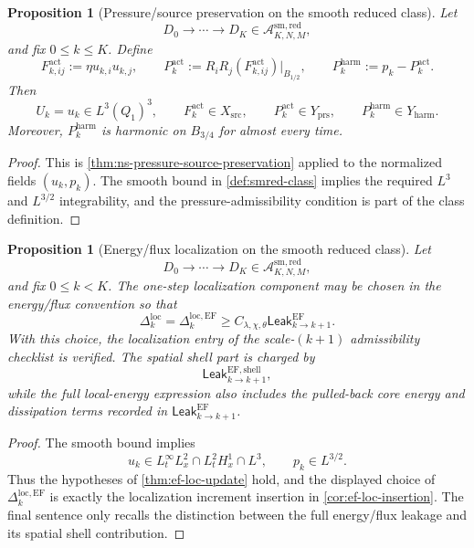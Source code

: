 \documentclass[11pt]{article}
\numberwithin{equation}{section}
\theoremstyle{plain}
\newtheorem{proposition}[theorem]{Proposition}
\theoremstyle{definition}
\theoremstyle{remark}
\newcommand{\prs}{\mathrm{prs}}
\newcommand{\harm}{\mathrm{harm}}
\newcommand{\locerr}{\mathrm{loc}}
\newcommand{\Leak}{\mathsf{Leak}}
\newcommand{\A}{\mathcal A}
\begin{document}
\begin{proposition}[Pressure/source preservation on the smooth reduced class]\label{prop:smred-pressure-source}
Let
\[
  D_0\to\cdots\to D_K\in\A_{K,N,M}^{\mathrm{sm,red}},
\]
and fix \(0\le k\le K\).  Define
\[
  F^{\mathrm{act}}_{k,ij}:=\eta u_{k,i}u_{k,j},
  \qquad
  P_k^{\mathrm{act}}:=R_iR_j(F^{\mathrm{act}}_{k,ij})\big|_{B_{1/2}},
  \qquad
  P_k^{\harm}:=p_k-P_k^{\mathrm{act}}.
\]
Then
\[
  U_k=u_k\in L^3(Q_1)^3,\qquad
  F_k^{\mathrm{act}}\in X_{\mathrm{src}},
  \qquad
  P_k^{\mathrm{act}}\in Y_{\prs},
  \qquad
  P_k^{\harm}\in Y_{\harm}.
\]
Moreover, \(P_k^{\harm}\) is harmonic on \(B_{3/4}\) for almost every time.
\end{proposition}

\begin{proof}
This is \cref{thm:ns-pressure-source-preservation} applied to the normalized
fields \((u_k,p_k)\).  The smooth bound in
\cref{def:smred-class} implies the required \(L^3\) and \(L^{3/2}\)
integrability, and the pressure-admissibility condition is part of the class
definition.
\end{proof}

\begin{proposition}[Energy/flux localization on the smooth reduced class]\label{prop:smred-ef-loc}
Let
\[
  D_0\to\cdots\to D_K\in\A_{K,N,M}^{\mathrm{sm,red}},
\]
and fix \(0\le k<K\).  The one-step localization component may be chosen in
the energy/flux convention so that
\[
  \Delta_k^{\locerr}
  =
  \Delta_k^{\locerr,\mathrm{EF}}
  \ge
  C_{\lambda,\chi,\theta}\Leak_{k\to k+1}^{\mathrm{EF}}.
\]
With this choice, the localization entry of the scale-\((k+1)\)
admissibility checklist is verified.  The spatial shell part is charged by
\[
  \Leak_{k\to k+1}^{\mathrm{EF,shell}},
\]
while the full local-energy expression also includes the pulled-back core
energy and dissipation terms recorded in
\(\Leak_{k\to k+1}^{\mathrm{EF}}\).
\end{proposition}

\begin{proof}
The smooth bound implies
\[
  u_k\in L^\infty_tL^2_x\cap L^2_tH^1_x\cap L^3,
  \qquad
  p_k\in L^{3/2}.
\]
Thus the hypotheses of \cref{thm:ef-loc-update} hold, and the displayed
choice of \(\Delta_k^{\locerr,\mathrm{EF}}\) is exactly the localization
increment insertion in \cref{cor:ef-loc-insertion}.  The final sentence only
recalls the distinction between the full energy/flux leakage and its spatial
shell contribution.
\end{proof}
\end{document}
